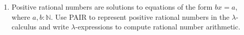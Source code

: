 \documentclass[11pt]{report}
\begin{document}
\begin{enumerate}
%
%	
%
%
%				
%
%
%
%			
%
%			

	\newpage
	\item Positive rational numbers are solutions to equations of the form $bx = a$, where $a,b : \mathbb{N}$. Use PAIR to represent positive rational numbers in the $\lambda$-calculus and write $\lambda$-expressions to compute rational number arithmetic. 
	

\end{enumerate}
\end{document}
